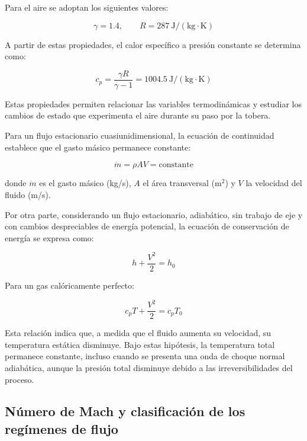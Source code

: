 \documentclass[12pt,letterpaper]{article}
\numberwithin{equation}{section}
\begin{document}
Para el aire se adoptan los siguientes valores:

\begin{equation}
    \gamma=1.4,
    \qquad
    R=287\ \mathrm{J/(kg\cdot K)}
\end{equation}

A partir de estas propiedades, el calor específico
a presión constante se determina como:

\begin{equation}
    c_p=\frac{\gamma R}{\gamma-1}
    =1004.5\ \mathrm{J/(kg\cdot K)}
\end{equation}

Estas propiedades permiten relacionar las variables
termodinámicas y estudiar los cambios de estado
que experimenta el aire durante su paso por la tobera.

Para un flujo estacionario cuasiunidimensional,
la ecuación de continuidad establece que el
gasto másico permanece constante:

\begin{equation}
    \dot{m}=\rho AV=\mathrm{constante}
\end{equation}

donde $\dot{m}$ es el gasto másico (kg/s),
$A$ el área transversal (m$^2$) y $V$
la velocidad del fluido (m/s).

Por otra parte, considerando un flujo estacionario,
adiabático, sin trabajo de eje y con cambios
despreciables de energía potencial, la ecuación
de conservación de energía se expresa como:

\begin{equation}
    h+\frac{V^2}{2}=h_0
\end{equation}

Para un gas calóricamente perfecto:

\begin{equation}
    c_pT+\frac{V^2}{2}=c_pT_0
\end{equation}

Esta relación indica que, a medida que el fluido
aumenta su velocidad, su temperatura estática
disminuye. Bajo estas hipótesis, la temperatura
total permanece constante, incluso cuando se
presenta una onda de choque normal adiabática,
aunque la presión total disminuye debido a
las irreversibilidades del proceso.


\subsection{Número de Mach y clasificación de los regímenes de flujo}
\end{document}
